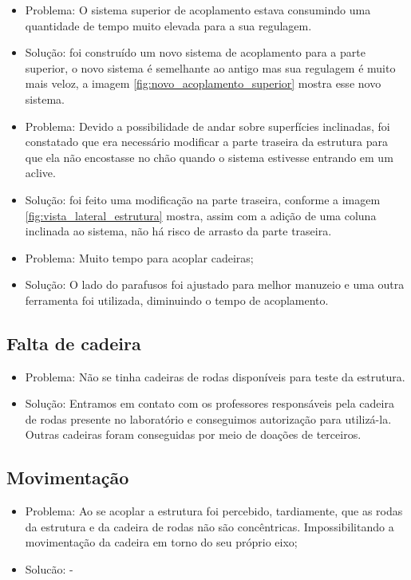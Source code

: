  \begin{itemize}
   \item Problema: O sistema superior de acoplamento estava consumindo uma quantidade de tempo muito elevada para a sua regulagem.
   \item Solução: foi construído um novo sistema de acoplamento para a parte superior, o novo sistema é semelhante ao antigo mas sua regulagem é muito mais veloz, a imagem \ref{fig:novo_acoplamento_superior} mostra esse novo sistema.

   \item Problema: Devido a possibilidade de andar sobre superfícies inclinadas, foi constatado que era necessário modificar a parte traseira da estrutura para que ela não encostasse no chão quando o sistema estivesse entrando em um aclive.
   \item Solução: foi feito uma modificação na parte traseira, conforme a imagem \ref{fig:vista_lateral_estrutura} mostra, assim com a adição de uma coluna inclinada ao sistema, não há risco de arrasto da parte traseira.

   \item Problema: Muito tempo para acoplar cadeiras;
   \item Solução: O lado do parafusos foi ajustado para melhor manuzeio e uma outra ferramenta foi utilizada, diminuindo o tempo de acoplamento.

 \end{itemize}

\subsection{Falta de cadeira}
 \begin{itemize}
  \item Problema: Não se tinha cadeiras de rodas disponíveis para teste da estrutura.
  \item Solução: Entramos em contato com os professores responsáveis pela cadeira de rodas presente no laboratório e conseguimos autorização para utilizá-la. Outras cadeiras foram conseguidas por meio de doações de terceiros.
 \end{itemize}

 \subsection{Movimentação}
   \begin{itemize}
     \item Problema: Ao se acoplar a estrutura foi percebido, tardiamente, que as rodas da estrutura e da cadeira de rodas não são concêntricas. Impossibilitando a movimentação da cadeira em torno do seu próprio eixo;
     \item Solucão: -
   \end{itemize}
